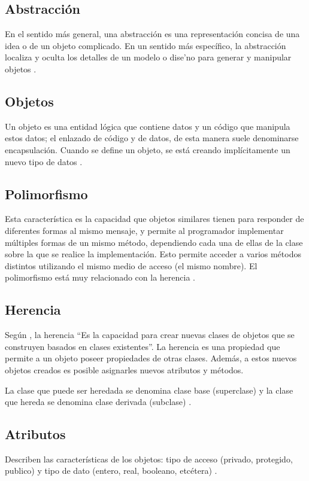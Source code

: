\subsection{Abstracción}
En el sentido más general, una abstracción es una representación concisa de una idea o de un objeto complicado. En un sentido más específico, la abstracción localiza y oculta los detalles de un modelo o dise'no para generar y manipular objetos \citep{izquierdo2007introduccion}. 

\subsection{Objetos}
Un objeto es una entidad lógica que contiene datos y un código que manipula estos datos; el enlazado de código y de datos, de esta manera suele denominarse encapsulación. Cuando se define un objeto, se está creando implícitamente un nuevo tipo de datos \citep{izquierdo2007introduccion}.

\subsection{Polimorfismo}
Esta característica es la capacidad que objetos similares tienen para responder de
diferentes formas al mismo mensaje, y permite al programador implementar
múltiples formas de un mismo método, dependiendo cada una de ellas de la clase
sobre la que se realice la implementación. Esto permite acceder a varios métodos
distintos utilizando el mismo medio de acceso (el mismo nombre). El polimorfismo
está muy relacionado con la herencia \citep{velarde2006introduccion}.

\subsection{Herencia}
Según \cite{joyanes1996programacion}, la herencia “Es la capacidad para crear nuevas
clases de objetos que se construyen basados en clases existentes”. La herencia
es una propiedad que permite a un objeto poseer propiedades de otras clases.
Además, a estos nuevos objetos creados es posible asignarles nuevos atributos
y métodos.

La clase que puede ser heredada se denomina clase base (superclase) y la clase
que hereda se denomina clase derivada (subclase) \citep{velarde2006introduccion}.

\subsection{Atributos}
Describen las características de los objetos: tipo de acceso (privado, protegido, publico) y tipo de dato (entero, real, booleano, etcétera) \citep{izquierdo2007introduccion}. 

